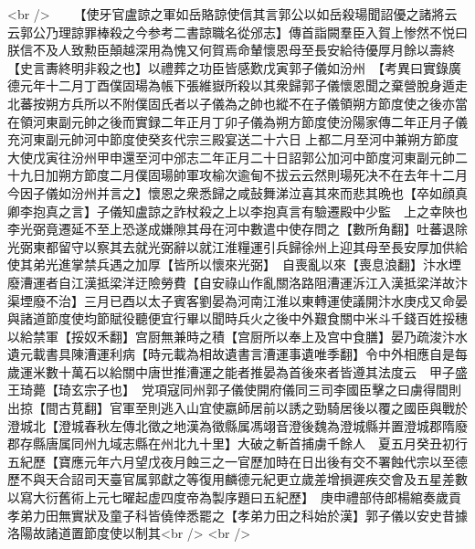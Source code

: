 <br />
　　【使牙官盧諒之軍如岳賂諒使信其言郭公以如岳殺瑒聞詔優之諸將云云郭公乃理諒罪棒殺之今参考二書諒職名從邠志】傳首詣闕羣臣入賀上惨然不悦曰朕信不及人致勲臣顛越深用為愧又何賀焉命輦懷恩母至長安給待優厚月餘以壽終【史言夀終明非殺之也】以禮葬之功臣皆感歎戊寅郭子儀如汾州　【考異曰實錄廣德元年十二月丁酉僕固瑒為帳下張維嶽所殺以其衆歸郭子儀懷恩聞之棄營脫身遁走北蕃按朔方兵所以不附僕固氏者以子儀為之帥也縱不在子儀領朔方節度使之後亦當在領河東副元帥之後而實録二年正月丁卯子儀為朔方節度使汾陽家傳二年正月子儀充河東副元帥河中節度使癸亥代宗三殿宴送二十六日上都二月至河中兼朔方節度大使戊寅往汾州甲申還至河中邠志二年正月二十日詔郭公加河中節度河東副元帥二十九日加朔方節度二月僕固瑒帥軍攻榆次逾甸不拔云云然則瑒死决不在去年十二月今因子儀如汾州并言之】懷恩之衆悉歸之咸鼔舞涕泣喜其來而悲其晩也【卒如顔真卿李抱真之言】子儀知盧諒之詐杖殺之上以李抱真言有驗遷殿中少監　上之幸陜也李光弼竟遷延不至上恐遂成嫌隙其母在河中數遣中使存問之【數所角翻】吐蕃退除光弼東都留守以察其去就光弼辭以就江淮糧運引兵歸徐州上迎其母至長安厚加供給使其弟光進掌禁兵遇之加厚【皆所以懷來光弼】　自喪亂以來【喪息浪翻】汴水堙廢漕運者自江漢抵梁洋迂險勞費【自安祿山作亂關洛路阻漕運泝江入漢抵梁洋故汴渠堙廢不治】三月已酉以太子賓客劉晏為河南江淮以東轉運使議開汴水庚戍又命晏與諸道節度使均節賦役聽便宜行畢以聞時兵火之後中外艱食關中米斗千錢百姓挼穗以給禁軍【挼奴禾翻】宫厨無兼時之積【宫厨所以奉上及宫中食膳】晏乃疏浚汴水遺元載書具陳漕運利病【時元載為相故遺書言漕運事遺唯季翻】令中外相應自是每歲運米數十萬石以給關中唐世推漕運之能者推晏為首後來者皆遵其法度云　甲子盛王琦薨【琦玄宗子也】　党項寇同州郭子儀使開府儀同三司李國臣擊之曰虜得間則出掠【間古莧翻】官軍至則逃入山宜使嬴師居前以誘之勁騎居後以覆之國臣與戰於澄城北【澄城春秋左傳北徵之地漢為徵縣属馮翊音澄後魏為澄城縣并置澄城郡隋廢郡存縣唐属同州九域志縣在州北九十里】大破之斬首捕虜千餘人　夏五月癸丑初行五紀歷【寶應元年六月望戊夜月蝕三之一官歷加時在日出後有交不署蝕代宗以至德歷不與天合詔司天臺官属郭獻之等復用麟德元紀更立歲差增損遲疾交會及五星差數以寫大衍舊術上元七曜起虚四度帝為製序題曰五紀歷】　庚申禮部侍郎楊綰奏歲貢孝弟力田無實狀及童子科皆僥倖悉罷之【孝弟力田之科始於漢】郭子儀以安史昔據洛陽故諸道置節度使以制其<br />
<br />
